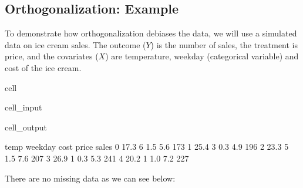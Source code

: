 \documentclass[letterpaper,10pt,english]{jupyterBook}
\begin{document}
\subsection{Orthogonalization: Example}
\label{\detokenize{orthogonal_DML:orthogonalization-example}}
\sphinxAtStartPar
To demonstrate how orthogonalization debiases the data, we will use a simulated data on ice cream sales. The outcome (\(Y\)) is the number of sales, the treatment is price, and the covariates (\(X\)) are temperature, weekday (categorical variable) and cost of the ice cream.

\begin{sphinxuseclass}{cell}\begin{sphinxVerbatimInput}

\begin{sphinxuseclass}{cell_input}
\begin{sphinxVerbatim}[commandchars=\\\{\}]
  
\end{sphinxVerbatim}

\end{sphinxuseclass}\end{sphinxVerbatimInput}
\begin{sphinxVerbatimOutput}

\begin{sphinxuseclass}{cell_output}
\begin{sphinxVerbatim}[commandchars=\\\{\}]
   temp  weekday  cost  price  sales
0  17.3        6   1.5    5.6    173
1  25.4        3   0.3    4.9    196
2  23.3        5   1.5    7.6    207
3  26.9        1   0.3    5.3    241
4  20.2        1   1.0    7.2    227
\end{sphinxVerbatim}

\end{sphinxuseclass}\end{sphinxVerbatimOutput}

\end{sphinxuseclass}
\sphinxAtStartPar
There are no missing data as we can see below:
\end{document}
